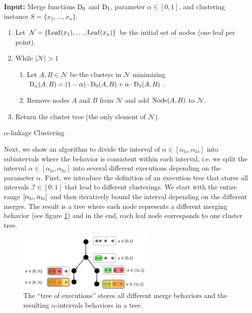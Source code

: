 \begin{algorithm}
\textbf{Input:} Merge functions $\operatorname{D_{0}}$ and $\operatorname{D_{1}}$, parameter $\alpha \in [0,1]$, and clustering instance $S = \{x_1, \dots, x_n\}$.
\begin{enumerate}[nosep, leftmargin=*]
\item Let $\mathcal{N} = \{\operatorname{Leaf}(x_1), \dots, \operatorname{Leaf}(x_n)\}$ be the initial set of nodes (one leaf per point).
\item While $|\mathcal{N}| > 1$
\begin{enumerate}[nosep, leftmargin=*]
  \item Let $A, B \in \mathcal{N}$ be the clusters in $\mathcal{N}$ minimizing $\operatorname{D_{\alpha}}(A,B) = (1-\alpha)\cdot \operatorname{D_{0}}(A,B) + \alpha \cdot \operatorname{D_{1}}(A,B)$.
  \item Remove nodes $A$ and $B$ from $\mathcal{N}$ and add $\operatorname{Node}(A,B)$ to $\mathcal{N}$.
\end{enumerate}
\item Return the cluster tree (the only element of $\mathcal{N}$).
\end{enumerate}
\caption{$\alpha$-linkage Clustering}
\label{alg:alphalinkage}
\end{algorithm}

 Next, we show an algorithm to divide the interval of $\alpha \in [\alpha_{lo}, \alpha_{hi}]$ into subintervals where the behavior is consistent within each interval, i.e. we split the interval $\alpha \in [\alpha_{lo}, \alpha_{hi}]$ into several different executions depending on the parameter $\alpha$. First, we introduce the definition of an execution tree that stores all intervals $\mathcal{I} \in [0,1]$ that lead to different clusterings. We start with the entire range $[\alpha_\text{lo}, \alpha_\text{hi}]$ and then iteratively bound the interval depending on the different merges. The result is a tree where each node represents a different merging behavior (see figure \ref{fig:toe}) and in the end, each leaf node corresponds to one cluster tree.

 \begin{figure}[h]
    \centering
    \includegraphics[width=0.6\textwidth]{images/ClusterTreeFigure}
    \caption{The ``tree of executions'' stores all different merge behaviors and the resulting $\alpha$-intervals behaviors in a tree.}
    \label{fig:toe}
\end{figure}

